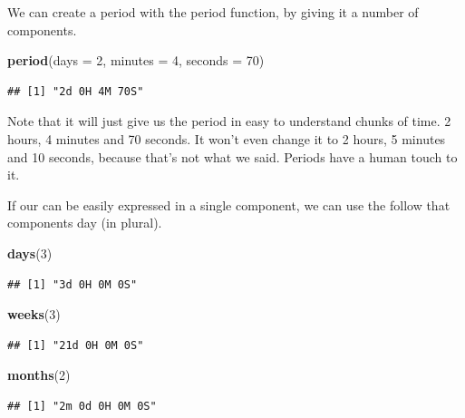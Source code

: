 \documentclass[]{tufte-book}
\newenvironment{Shaded}{}{}
\newcommand{\DataTypeTok}[1]{\textcolor[rgb]{0.56,0.13,0.00}{#1}}
\newcommand{\DecValTok}[1]{\textcolor[rgb]{0.25,0.63,0.44}{#1}}
\newcommand{\KeywordTok}[1]{\textcolor[rgb]{0.00,0.44,0.13}{\textbf{#1}}}
\newcommand{\NormalTok}[1]{#1}
\begin{document}
We can create a period with the period function, by giving it a number of components.

\begin{Shaded}
\begin{Highlighting}[]
\KeywordTok{period}\NormalTok{(}\DataTypeTok{days =} \DecValTok{2}\NormalTok{, }\DataTypeTok{minutes =} \DecValTok{4}\NormalTok{, }\DataTypeTok{seconds =} \DecValTok{70}\NormalTok{)}
\end{Highlighting}
\end{Shaded}

\begin{verbatim}
## [1] "2d 0H 4M 70S"
\end{verbatim}

Note that it will just give us the period in easy to understand chunks of time. 2 hours, 4 minutes and 70 seconds. It won't even change it to 2 hours, 5 minutes and 10 seconds, because that's not what we said. Periods have a human touch to it.

If our can be easily expressed in a single component, we can use the follow that components day (in plural).

\begin{Shaded}
\begin{Highlighting}[]
\KeywordTok{days}\NormalTok{(}\DecValTok{3}\NormalTok{)}
\end{Highlighting}
\end{Shaded}

\begin{verbatim}
## [1] "3d 0H 0M 0S"
\end{verbatim}

\begin{Shaded}
\begin{Highlighting}[]
\KeywordTok{weeks}\NormalTok{(}\DecValTok{3}\NormalTok{)}
\end{Highlighting}
\end{Shaded}

\begin{verbatim}
## [1] "21d 0H 0M 0S"
\end{verbatim}

\begin{Shaded}
\begin{Highlighting}[]
\KeywordTok{months}\NormalTok{(}\DecValTok{2}\NormalTok{)}
\end{Highlighting}
\end{Shaded}

\begin{verbatim}
## [1] "2m 0d 0H 0M 0S"
\end{verbatim}
\end{document}
